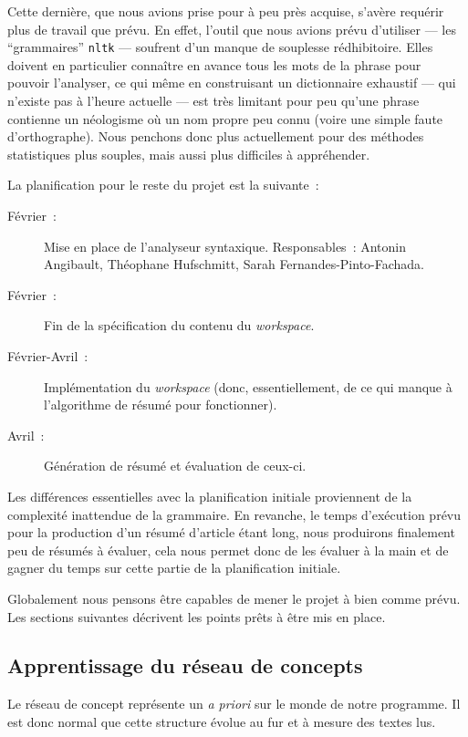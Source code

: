 \documentclass[a4paper, 12pt]{article}
\newcommand{\pyt}[1]{\texttt{#1}}%
\begin{document}
Cette dernière, que nous avions prise pour à peu près acquise, s'avère requérir plus de travail que prévu. En effet, l'outil que nous avions prévu d'utiliser --- les ``grammaires'' \pyt{nltk} --- soufrent d'un manque de souplesse rédhibitoire. Elles doivent en particulier connaître en avance tous les mots de la phrase pour pouvoir l'analyser, ce qui même en construisant un dictionnaire exhaustif --- qui n'existe pas à l'heure actuelle --- est très limitant pour peu qu'une phrase contienne un néologisme où un nom propre peu connu (voire une simple faute d'orthographe). Nous penchons donc plus actuellement pour des méthodes statistiques plus souples, mais aussi plus difficiles à appréhender.

\vspace{1\baselineskip}

La planification pour le reste du projet est la suivante~:
\begin{description}
	\item[Février~: ]Mise en place de l'analyseur syntaxique. Responsables~: Antonin Angibault, Théophane Hufschmitt, Sarah Fernandes-Pinto-Fachada.
	\item[Février~: ]Fin de la spécification du contenu du \textit{workspace}.
	\item[Février-Avril~: ]Implémentation du \textit{workspace} (donc, essentiellement, de ce qui manque à l'algorithme de résumé pour fonctionner).
	\item[Avril~: ]Génération de résumé et évaluation de ceux-ci.
\end{description}

Les différences essentielles avec la planification initiale proviennent de la complexité inattendue de la grammaire. En revanche, le temps d'exécution prévu pour la production d'un résumé d'article étant long, nous produirons finalement peu de résumés à évaluer, cela nous permet donc de les évaluer à la main et de gagner du temps sur cette partie de la planification initiale.

Globalement nous pensons être capables de mener le projet à bien comme prévu. Les sections suivantes décrivent les points prêts à être mis en place.

\subsection{Apprentissage du réseau de concepts}
Le réseau de concept représente un \textit{a priori} sur le monde de notre programme. Il est donc normal que cette structure évolue au fur et à mesure des textes lus.
\end{document}
